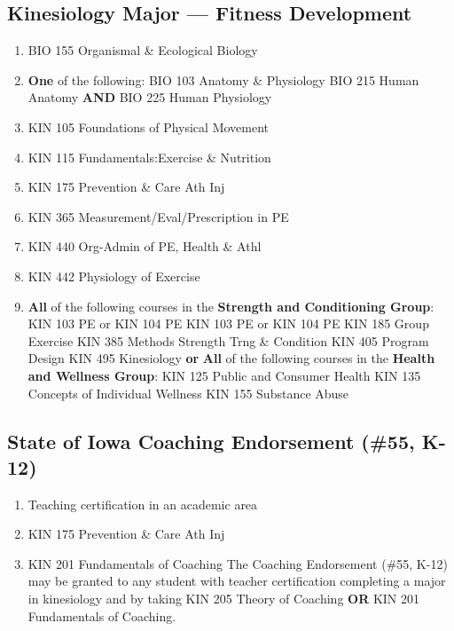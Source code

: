 \documentclass[
  letterpaper,
]{scrbook}
\providecommand{\tightlist}{%
  \setlength{\itemsep}{0pt}\setlength{\parskip}{0pt}}
\begin{document}
\hypertarget{kinesiology-major-fitness-development}{%
\subsection{Kinesiology Major --- Fitness
Development}\label{kinesiology-major-fitness-development}}

\begin{enumerate}
\def\labelenumi{\arabic{enumi}.}
\tightlist
\item
  BIO 155 Organismal \& Ecological Biology
\item
  \textbf{One} of the following: BIO 103 Anatomy \& Physiology BIO 215
  Human Anatomy \textbf{AND} BIO 225 Human Physiology
\item
  KIN 105 Foundations of Physical Movement
\item
  KIN 115 Fundamentals:Exercise \& Nutrition
\item
  KIN 175 Prevention \& Care Ath Inj
\item
  KIN 365 Measurement/Eval/Prescription in PE
\item
  KIN 440 Org-Admin of PE, Health \& Athl
\item
  KIN 442 Physiology of Exercise
\item
  \textbf{All} of the following courses in the \textbf{Strength and
  Conditioning Group}: KIN 103 PE or KIN 104 PE KIN 103 PE or KIN 104 PE
  KIN 185 Group Exercise KIN 385 Methods Strength Trng \& Condition KIN
  405 Program Design KIN 495 Kinesiology \textbf{or} \textbf{All} of the
  following courses in the \textbf{Health and Wellness Group}: KIN 125
  Public and Consumer Health KIN 135 Concepts of Individual Wellness KIN
  155 Substance Abuse
\end{enumerate}

\hypertarget{state-of-iowa-coaching-endorsement-55-k-12}{%
\subsection{State of Iowa Coaching Endorsement (\#55,
K-12)}\label{state-of-iowa-coaching-endorsement-55-k-12}}

\begin{enumerate}
\def\labelenumi{\arabic{enumi}.}
\tightlist
\item
  Teaching certification in an academic area
\item
  KIN 175 Prevention \& Care Ath Inj
\item
  KIN 201 Fundamentals of Coaching The Coaching Endorsement (\#55, K-12)
  may be granted to any student with teacher certification completing a
  major in kinesiology and by taking KIN 205 Theory of Coaching
  \textbf{OR} KIN 201 Fundamentals of Coaching.
\end{enumerate}
\end{document}
